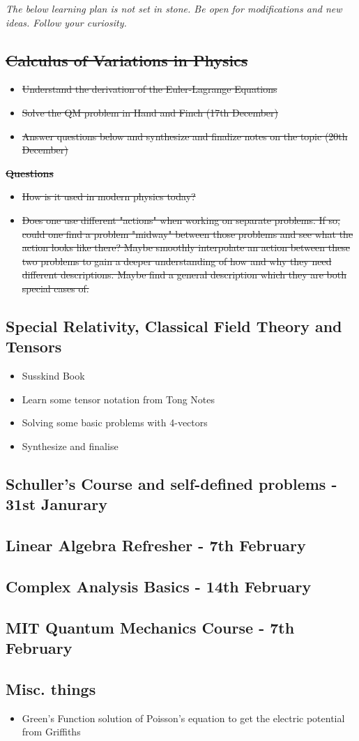 \textit{The below learning plan is not set in stone. Be open for modifications and new ideas. Follow your curiosity.}
\subsection*{\sout{Calculus of Variations in Physics}}   
\begin{itemize}
    \item \sout{Understand the derivation of the Euler-Lagrange Equations}
    \item \sout{Solve the QM problem in Hand and Finch (17th December)}
    \item \sout{Answer questions below and synthesize and finalize notes on the topic (20th December)}
\end{itemize}
\textbf{\sout{Questions}}
\begin{itemize}
    \item \sout{How is it used in modern physics today?}
    \item \sout{Does one use different "actions" when working on separate problems. If so, could one find a problem "midway" between those problems and see what the action looks like there? Maybe smoothly interpolate an action between these two problems to gain a deeper understanding of how and why they need different descriptions. Maybe find a general description which they are both special cases of.}
\end{itemize} 
\subsection*{Special Relativity, Classical Field Theory and Tensors}
\begin{itemize}
    \item Susskind Book 
    \item Learn some tensor notation from Tong Notes
    \item Solving some basic problems with 4-vectors 
    \item Synthesize and finalise
\end{itemize}
\subsection*{Schuller's Course and self-defined problems - 31st Janurary}
\subsection*{Linear Algebra Refresher - 7th February}
\subsection*{Complex Analysis Basics - 14th February}
\subsection*{MIT Quantum Mechanics Course - 7th February}
\subsection*{Misc. things}
\begin{itemize}
    \item Green's Function solution of Poisson's equation to get the electric potential from Griffiths
\end{itemize}